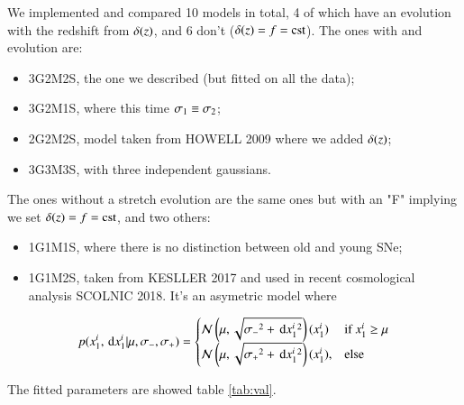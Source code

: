 \documentclass{aa}
\begin{document}
We implemented and compared 10 models in total, 4 of which have an
evolution with the redshift from $\delta(z)$, and 6 don't ($\delta(z) = f =
\mathrm{cst}$). The ones with and evolution are:
\begin{itemize}
    \item 3G2M2S, the one we described (but fitted on all the data);
    \item 3G2M1S, where this time $\sigma_1 \equiv \sigma_2$;
    \item 2G2M2S, model taken from HOWELL 2009 where we added $\delta(z)$;
    \item 3G3M3S, with three independent gaussians.
\end{itemize}
The ones without a stretch evolution are the same ones but with an "F" implying
we set $\delta(z) = f = \mathrm{cst}$, and two others:
\begin{itemize}
    \item 1G1M1S, where there is no distinction between old and young SNe;
    \item 1G1M2S, taken from KESLLER 2017 and used in recent cosmological
        analysis SCOLNIC 2018. It's an asymetric model where
\end{itemize}

\begin{align}
 p(x_1^i, \,\mathrm{d} x_1^i | \mu, \sigma_-, \sigma_+) = 
    \begin{cases}
        \mathcal{N} \left(\mu, \sqrt{\sigma_-{}^2 + \,\mathrm{d} x_1^i{}^{2}}\right) (x_1^i) & \text{if
        } x_1^i\geq \mu\\
        \mathcal{N} \left(\mu, \sqrt{\sigma_+{}^2 + \,\mathrm{d} x_1^i{}^{2}}\right) (x_1^i), &
        \text{else}
    \end{cases}
\end{align} 

The fitted parameters are showed table \ref{tab:val}.
\end{document}
